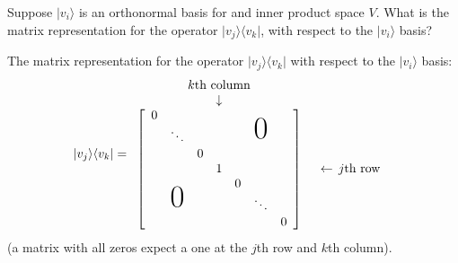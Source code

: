 \documentclass[en]{sol-man}
\begin{document}
\begin{exe}
    Suppose $\lvert v_i\rangle$ is an orthonormal basis for and inner product space $V$. What is the matrix representation for the operator $\lvert v_j\rangle\langle v_k\rvert$, with respect to the $\lvert v_i\rangle$ basis?
\end{exe}
\begin{sol}
    The matrix representation for the operator $\lvert v_j\rangle\langle v_k\rvert$ with respect to the $\lvert v_i\rangle$ basis:
    \begin{align}
        \lvert v_j\rangle\langle v_k\rvert=\begin{array}{cc}
            \begin{array}{ccccccc}
                \multicolumn{7}{c}{k\text{th column}} \\
                 &  &  & \downarrow &  &  & 
                \end{array} & \begin{array}{c}
                    \\
                    \\
                   \end{array} \\
            \left[\begin{array}{ccccccc}
                0 &  &  &  & \multicolumn{3}{c}{\multirow{3}{*}{\Huge0}} \\
                 & \ddots &  &  & \multicolumn{3}{c}{} \\
                 &  & 0 &  & \multicolumn{3}{c}{} \\
                 &  &  & 1 &  &  &  \\
                \multicolumn{3}{c}{\multirow{3}{*}{\Huge0}} &  & 0 &  &  \\
                \multicolumn{3}{c}{} &  &  & \ddots &  \\
                \multicolumn{3}{c}{} &  &  &  & 0
                \end{array}\right] & \begin{array}{c}
                    \\
                    \\
                    \\
                   \leftarrow\,j\text{th row} \\
                    \\
                    \\
                    \\
                   \end{array}
        \end{array}
    \end{align}
    (a matrix with all zeros expect a one at the $j$th row and $k$th column).
\end{sol}
\end{document}
